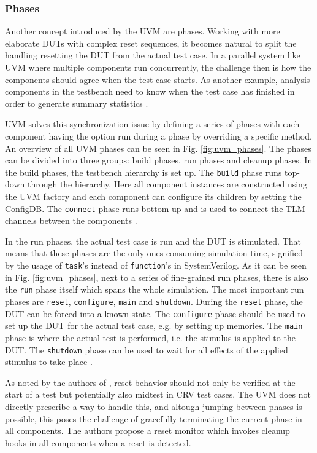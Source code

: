 \documentclass[11pt]{report}
\newcommand{\ttt}{\texttt}
\begin{document}
\subsubsection{Phases}
Another concept introduced by the UVM are phases. Working with more elaborate DUTs with complex reset sequences, it
becomes natural to split the handling resetting the DUT from the actual test case. In a parallel system like UVM
where multiple components run concurrently, the challenge then is how the components should agree when the test case
starts. As another example, analysis components in the testbench need to know when the test case has finished in
order to generate summary statistics \cite[ch. 4.6]{mehta2018asic}.

UVM solves this synchronization issue by defining a series of phases with each component having the option run during
a phase by overriding a specific method. An overview of all UVM phases can be seen in Fig. \ref{fig:uvm_phases}. The
phases can be divided into three groups: build phases, run phases and cleanup phases. In the build phases, the
testbench hierarchy is set up. The \ttt{build} phase runs top-down through the hierarchy. Here all component
instances are constructed using the UVM factory and each component can configure its children by setting the
ConfigDB. The \ttt{connect} phase runs bottom-up and is used to connect the TLM channels between the components
\cite[ch. 4.6]{mehta2018asic}.

In the run phases, the actual test case is run and the DUT is stimulated. That means that these phases are the only
ones consuming simulation time, signified by the usage of \ttt{task}'s instead of \ttt{function}'s in SystemVerilog.
As it can be seen in Fig. \ref{fig:uvm_phases}, next to a series of fine-grained run phases, there is also the
\ttt{run} phase itself which spans the whole simulation. The most important run phases are \ttt{reset},
\ttt{configure}, \ttt{main} and \ttt{shutdown}. During the \ttt{reset} phase, the DUT can be forced into a known
state. The \ttt{configure} phase should be used to set up the DUT for the actual test case, e.g. by setting up
memories. The \ttt{main} phase is where the actual test is performed, i.e. the stimulus is applied to the DUT. The
\ttt{shutdown} phase can be used to wait for all effects of the applied stimulus to take place \cite[ch. 4.6]{mehta2018asic}.

As noted by the authors of \cite{dvcon2014reset}, reset behavior should not only be verified at the start of a test
but potentially also midtest in CRV test cases. The UVM does not directly prescribe a way to handle this, and altough
jumping between phases is possible, this poses the challenge of gracefully terminating the current phase in all
components. The authors propose a reset monitor which invokes cleanup hooks in all components when a reset is detected.
\end{document}
